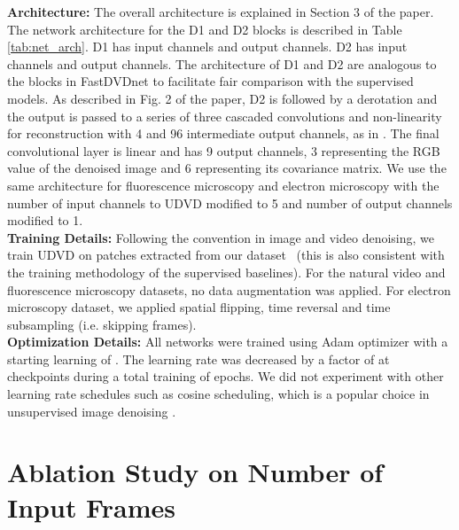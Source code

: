 \documentclass[final]{cvpr}
\begin{document}
\textbf{Architecture:} The overall architecture is explained in Section 3 of the paper. The network architecture for the D1 and D2 blocks is described in Table \ref{tab:net_arch}. D1 has  input channels and  output channels. D2 has  input channels and  output channels. The architecture of D1 and D2 are analogous to the blocks in FastDVDnet \cite{fastdvdnet} to facilitate fair comparison with the supervised models. As described in Fig. 2 of the paper, D2 is followed by a derotation and the output is passed to a series of three cascaded  convolutions and non-linearity for reconstruction with 4 and 96 intermediate output channels, as in \cite{blindspotnet}. The final convolutional layer is linear and has 9 output channels, 3 representing the RGB value of the denoised image and 6 representing its covariance matrix. We use the same architecture for fluorescence microscopy and electron microscopy with the number of input channels to UDVD modified to 5 and number of output channels modified to 1. \\ 

\noindent \textbf{Training Details:} Following the convention in image and video denoising, we train UDVD on  patches extracted from our dataset~\cite{dncnn, biasfree, blindspotnet, fastdvdnet, dvdnet} (this is also consistent with the training methodology of the supervised baselines). For the natural video and fluorescence microscopy datasets, no data augmentation was applied. For electron microscopy dataset, we applied spatial flipping, time reversal and time subsampling (i.e. skipping frames). \\

\noindent \textbf{Optimization Details:} All networks were trained using Adam \cite{adam} optimizer with a starting learning of . The learning rate was decreased by a factor of  at checkpoints  during a total training of  epochs. We did not experiment with other learning rate schedules such as cosine scheduling, which is a popular choice in unsupervised image denoising \cite{blindspotnet}. 



\section{Ablation Study on Number of Input Frames}
\label{sec:ablation}
\end{document}
